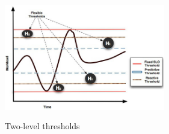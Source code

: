 \begin{figure}[t]
\begin{center}
\includegraphics[width=7cm, height=5.3cm]{./images/thresholdGraphic.jpg}
\end{center}
\vspace{-5mm}
\caption{Two-level  thresholds}
\label{flexibleThresholds}
\end{figure}



\vspace{3mm}

